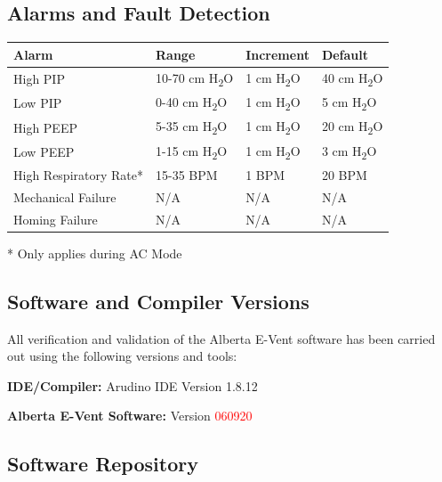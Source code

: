 \documentclass[]{article}
\begin{document}
\subsection{Alarms and Fault Detection}

\begin{center}
	
	\begin{table}[h]
		

	\begin{tabular}{ |p{4.3cm}| p{3cm}| p{3cm}|p{3cm}|}
		\hline
		\textbf{Alarm} & \textbf{Range} & \textbf{Increment} & \textbf{Default}\\
		\hline
		High PIP & 10-70 cm H\textsubscript{2}O & 1 cm H\textsubscript{2}O & 40 cm H\textsubscript{2}O\\
		\hline
		Low PIP & 0-40 cm H\textsubscript{2}O & 1 cm H\textsubscript{2}O & 5 cm H\textsubscript{2}O\\
		\hline
		High PEEP & 5-35 cm H\textsubscript{2}O & 1 cm H\textsubscript{2}O &  20 cm H\textsubscript{2}O\\
		\hline
		Low PEEP & 1-15 cm H\textsubscript{2}O & 1 cm H\textsubscript{2}O &  3 cm H\textsubscript{2}O\\
		\hline
		High Respiratory Rate* & 15-35 BPM & 1 BPM & 20 BPM\\
		\hline
		Mechanical Failure & N/A & N/A & N/A\\
		\hline
		Homing Failure & N/A & N/A & N/A \\
		\hline
	\end{tabular}

* Only applies during AC Mode

	\end{table}
	
\end{center}



\subsection{Software and Compiler Versions}

All verification and validation of the Alberta E-Vent software has been carried out using the following versions and tools:
\bigskip

\noindent\textbf{IDE/Compiler:} Arudino IDE Version 1.8.12

\noindent\textbf{Alberta E-Vent Software:} Version \textcolor{red}{060920}

\subsection{Software Repository}
\end{document}
